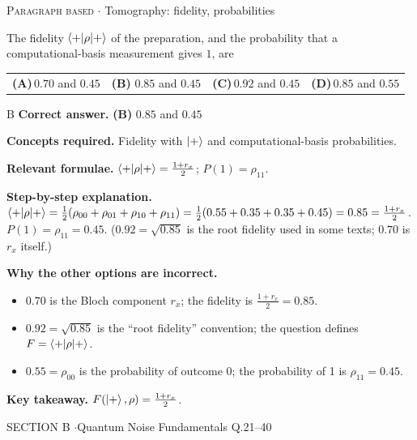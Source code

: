 \documentclass[11pt,a4paper]{article}
\newcommand{\optlabel}[1]{\textbf{(#1)}}
\newcommand{\correctlabel}[1]{\textcolor{okgreen}{\textbf{(#1)}\,\ding{51}}}
\newenvironment{qitem}[1]{\begin{list}{}{\setlength{\leftmargin}{3.3em}\setlength{\labelwidth}{3.1em}%
  \setlength{\labelsep}{0.2em}\setlength{\topsep}{3pt}\setlength{\parsep}{3pt}}\item[\textbf{Q.#1}\hfill]}{\end{list}}
\newcommand{\qsep}{\par\vspace{2pt}{\color{black!15}\hrule}\vspace{4pt}}
\newcommand{\qmeta}[2]{{\footnotesize\color{black!60}\textsc{#1} \;$\cdot$\; #2}\par}
\begin{document}
\begin{qitem}{20}
\qmeta{Paragraph based}{Tomography: fidelity, probabilities}
The fidelity $\braket{+|\rho|+}$ of the preparation, and the probability that a computational-basis measurement gives $1$, are
\par\smallskip\noindent\begin{tabularx}{\linewidth}{@{}*{4}{L}@{}}
\optlabel{A}\,$0.70$ and $0.45$ & \correctlabel{B}\,$0.85$ and $0.45$ & \optlabel{C}\,$0.92$ and $0.45$ & \optlabel{D}\,$0.85$ and $0.55$
\end{tabularx}
\end{qitem}
\begin{solbox}{B}
\textbf{\color{brand}Correct answer.} \textcolor{okgreen}{\textbf{(B)}} $0.85$ and $0.45$

\textbf{\color{brand}Concepts required.} Fidelity with $\ket+$ and computational-basis probabilities.

\textbf{\color{brand}Relevant formulae.} $\braket{+|\rho|+} = \frac{1 + r_x}{2}$; $P(1) = \rho_{11}$.

\textbf{\color{brand}Step-by-step explanation.} $\braket{+|\rho|+} = \frac12(\rho_{00} + \rho_{01} + \rho_{10} + \rho_{11}) = \frac12(0.55 + 0.35 + 0.35 + 0.45) = 0.85 = \frac{1 + r_x}{2}$.
$P(1) = \rho_{11} = 0.45$. ($0.92 = \sqrt{0.85}$ is the root fidelity used in some texts; $0.70$ is $r_x$ itself.)

\textbf{\color{brand}Why the other options are incorrect.}
\begin{itemize}[leftmargin=2.4em, itemsep=1pt, topsep=2pt]
\item[\textbf{(A)}] $0.70$ is the Bloch component $r_x$; the fidelity is $\frac{1 + r_x}{2} = 0.85$.
\item[\textbf{(C)}] $0.92 = \sqrt{0.85}$ is the ``root fidelity'' convention; the question defines $F = \braket{+|\rho|+}$.
\item[\textbf{(D)}] $0.55 = \rho_{00}$ is the probability of outcome 0; the probability of 1 is $\rho_{11} = 0.45$.
\end{itemize}
\textbf{\color{brand}Key takeaway.} $F(\ket+, \rho) = \frac{1 + r_x}{2}$.
\end{solbox}
\qsep

\newpage

\begin{sectionbanner}SECTION B \enspace$\cdot$\enspace Quantum Noise Fundamentals \hfill Q.21--40\end{sectionbanner}
\end{document}
